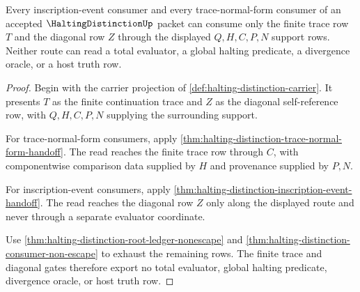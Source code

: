 \begin{theorem}
\label{thm:halting-distinction-inscription-trace-gate}
Every inscription-event consumer and every trace-normal-form consumer of an accepted $\HaltingDistinctionUp$ packet can consume only the finite trace row $T$ and the diagonal row $Z$ through the displayed $Q,H,C,P,N$ support rows. Neither route can read a total evaluator, a global halting predicate, a divergence oracle, or a host truth row.
\end{theorem}
\begin{proof}
Begin with the carrier projection of \autoref{def:halting-distinction-carrier}. It presents $T$ as the finite continuation trace and $Z$ as the diagonal self-reference row, with $Q,H,C,P,N$ supplying the surrounding support.

For trace-normal-form consumers, apply \autoref{thm:halting-distinction-trace-normal-form-handoff}. The read reaches the finite trace row through $C$, with componentwise comparison data supplied by $H$ and provenance supplied by $P,N$.

For inscription-event consumers, apply \autoref{thm:halting-distinction-inscription-event-handoff}. The read reaches the diagonal row $Z$ only along the displayed route and never through a separate evaluator coordinate.

Use \autoref{thm:halting-distinction-root-ledger-nonescape} and \autoref{thm:halting-distinction-consumer-non-escape} to exhaust the remaining rows. The finite trace and diagonal gates therefore export no total evaluator, global halting predicate, divergence oracle, or host truth row.
\end{proof}

